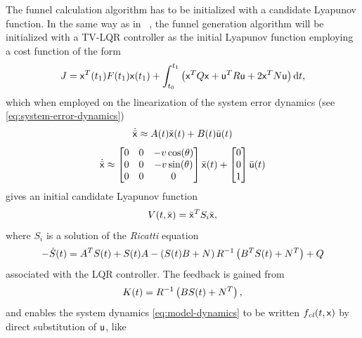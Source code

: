 The funnel calculation algorithm has to be initialized with a candidate Lyapunov
function. In the same way as in
\citeauthor{majumdarRobustOnlineMotion2013}~\cite{majumdarRobustOnlineMotion2013},
the funnel generation algorithm will be initialized with a \ac{TV-LQR}
controller as the initial Lyapunov function employing a cost function of the
form
\begin{equation}
  J = {\mathbf{\mathsf{x}}}^{T} (t_1) F(t_1) {\mathbf{\mathsf{x}}} (t_1) + \int_{t_{0}}^{t_{1}} \left( {\mathbf{\mathsf{x}}}^{T} Q {\mathbf{\mathsf{x}}} + {\mathbf{\mathsf{u}}}^{T} R {\mathbf{\mathsf{u}}} + 2 {\mathbf{\mathsf{x}}}^T N {\mathbf{\mathsf{u}}} \right) \mathrm{d}t,
\end{equation}
which when employed on the linearization of the system error dynamics (see
\cref{eq:system-error-dynamics})
\begin{equation}
  \dot{\bar{{\mathbf{\mathsf{x}}}}} \approx A (t)\bar{{\mathbf{\mathsf{x}}}}(t) + B(t) \bar{{\mathbf{\mathsf{u}}}}(t)
\end{equation}
\begin{equation}
  \dot{\bar{\vect{x}}} \approx %
  \begin{bmatrix}
    0 & 0 & -v\cos(\theta) \\
    0 & 0 & -v\sin(\theta) \\
    0 & 0 & 0 \\
  \end{bmatrix} %
  \bar{\vect{x}} (t) %
  + %
  \begin{bmatrix}
    0 \\ 0 \\ 1
  \end{bmatrix} %
  \bar{\vect{u}}(t)
\end{equation} 
gives an initial candidate Lyapunov function
\begin{equation}
  V(t,\bar{{\mathbf{\mathsf{x}}}}) = {\bar{{\mathbf{\mathsf{x}}}}}^{T} S_{i}\bar{{\mathbf{\mathsf{x}}}} ,
\end{equation}
where \(S_{i}\) is a solution of the \textit{Ricatti} equation
\begin{equation}
  \label{eq:ricatti}
  - \dot{S}(t) = A^{T} S(t) +S(t) A - \left( S(t) B + N \right) R^{-1}\left( B^{T} S(t) + N^{T} \right) + Q
\end{equation} 
associated with the \ac{LQR} controller. The feedback is gained from
\[
  K(t) = R^{-1} \left( B S(t) + N^T \right),
\]
and enables the system dynamics \cref{eq:model-dynamics} to be written
\(f_{\mathit{cl}}(t,{\mathbf{\mathsf{x}}})\) by direct substitution of \({\mathbf{\mathsf{u}}}\), like
